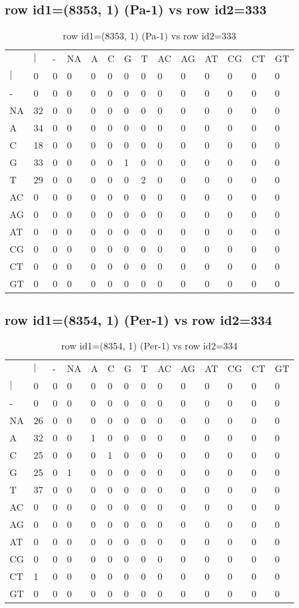 \subsection{row id1=(8353, 1) (Pa-1) vs row id2=333}
\begin{center}
\begin{longtable}{|l|l|l|l|l|l|l|l|l|l|l|l|l|l|}
\caption{row id1=(8353, 1) (Pa-1) vs row id2=333} \label{table_dm378}\\
\hline
\\
\hline
&$|$&-&NA&A&C&G&T&AC&AG&AT&CG&CT&GT\\
$|$&0&0&0&0&0&0&0&0&0&0&0&0&0\\
-&0&0&0&0&0&0&0&0&0&0&0&0&0\\
NA&32&0&0&0&0&0&0&0&0&0&0&0&0\\
A&34&0&0&0&0&0&0&0&0&0&0&0&0\\
C&18&0&0&0&0&0&0&0&0&0&0&0&0\\
G&33&0&0&0&0&1&0&0&0&0&0&0&0\\
T&29&0&0&0&0&0&2&0&0&0&0&0&0\\
AC&0&0&0&0&0&0&0&0&0&0&0&0&0\\
AG&0&0&0&0&0&0&0&0&0&0&0&0&0\\
AT&0&0&0&0&0&0&0&0&0&0&0&0&0\\
CG&0&0&0&0&0&0&0&0&0&0&0&0&0\\
CT&0&0&0&0&0&0&0&0&0&0&0&0&0\\
GT&0&0&0&0&0&0&0&0&0&0&0&0&0\\
\hline
\end{longtable}
\end{center}

\subsection{row id1=(8354, 1) (Per-1) vs row id2=334}
\begin{center}
\begin{longtable}{|l|l|l|l|l|l|l|l|l|l|l|l|l|l|}
\caption{row id1=(8354, 1) (Per-1) vs row id2=334} \label{table_dm380}\\
\hline
\\
\hline
&$|$&-&NA&A&C&G&T&AC&AG&AT&CG&CT&GT\\
$|$&0&0&0&0&0&0&0&0&0&0&0&0&0\\
-&0&0&0&0&0&0&0&0&0&0&0&0&0\\
NA&26&0&0&0&0&0&0&0&0&0&0&0&0\\
A&32&0&0&1&0&0&0&0&0&0&0&0&0\\
C&25&0&0&0&1&0&0&0&0&0&0&0&0\\
G&25&0&1&0&0&0&0&0&0&0&0&0&0\\
T&37&0&0&0&0&0&0&0&0&0&0&0&0\\
AC&0&0&0&0&0&0&0&0&0&0&0&0&0\\
AG&0&0&0&0&0&0&0&0&0&0&0&0&0\\
AT&0&0&0&0&0&0&0&0&0&0&0&0&0\\
CG&0&0&0&0&0&0&0&0&0&0&0&0&0\\
CT&1&0&0&0&0&0&0&0&0&0&0&0&0\\
GT&0&0&0&0&0&0&0&0&0&0&0&0&0\\
\hline
\end{longtable}
\end{center}

